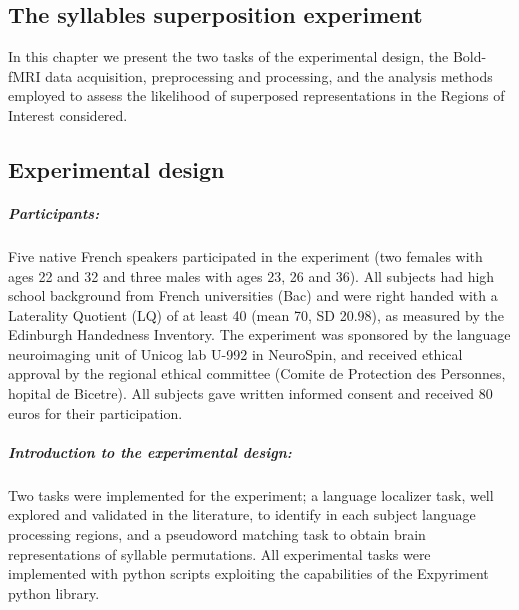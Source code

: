 \begin{fullwidth}
\chapter{\label{ch:super_methods}
The syllables superposition experiment}
\end{fullwidth}

\begin{chabstract}

In this chapter we present the two tasks of the experimental design, the Bold-fMRI data acquisition, preprocessing and processing, and the analysis methods employed to assess the likelihood of superposed representations in the Regions of Interest considered.

\end{chabstract}

\section{Experimental design}

\paragraph{Participants:}
Five native French speakers participated in the experiment (two females with ages 22 and 32 and three males with ages 23, 26 and 36).
All subjects had high school background from French universities (Bac) and were right handed with a Laterality Quotient (LQ) of at least 40 (mean 70, SD 20.98), as measured by the Edinburgh Handedness Inventory\citep{oldfield1971assessment}.
The experiment was sponsored by the language neuroimaging unit of Unicog lab U-992 in NeuroSpin, and received ethical approval by the regional ethical committee (Comite de Protection des Personnes, hopital de Bicetre).
All subjects gave written informed consent and received 80 euros for their participation.

\paragraph{Introduction to the experimental design:}

Two tasks were implemented for the experiment;
a language localizer task, well explored and validated in the literature\citep{mahowald2016reliable}, to identify in each subject language processing regions, and a pseudoword matching task to obtain brain representations of syllable permutations.
All experimental tasks were implemented with python scripts exploiting the capabilities of the Expyriment python library\citep{krause2014expyriment}.

